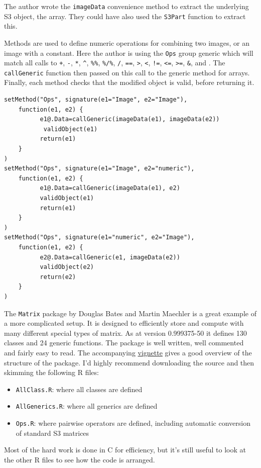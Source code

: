 The author wrote the \texttt{imageData} convenience method to extract
the underlying S3 object, the array. They could have also used the
\texttt{S3Part} function to extract this.

Methods are used to define numeric operations for combining two images,
or an image with a constant. Here the author is using the \texttt{Ops}
group generic which will match all calls to \texttt{+}, \texttt{-},
\texttt{*}, \texttt{\^{}}, \texttt{\%\%}, \texttt{\%/\%}, \texttt{/},
\texttt{==}, \texttt{\textgreater{}}, \texttt{\textless{}}, \texttt{!=},
\texttt{\textless{}=}, \texttt{\textgreater{}=}, \texttt{\&}, and
\texttt{\textbar{}}. The \texttt{callGeneric} function then passed on
this call to the generic method for arrays. Finally, each method checks
that the modified object is valid, before returning it.

\begin{verbatim}
setMethod("Ops", signature(e1="Image", e2="Image"),
    function(e1, e2) {
          e1@.Data=callGeneric(imageData(e1), imageData(e2))
           validObject(e1)
          return(e1)
    }
)
setMethod("Ops", signature(e1="Image", e2="numeric"),
    function(e1, e2) {
          e1@.Data=callGeneric(imageData(e1), e2)
          validObject(e1)
          return(e1)
    }
)
setMethod("Ops", signature(e1="numeric", e2="Image"),
    function(e1, e2) {
          e2@.Data=callGeneric(e1, imageData(e2))
          validObject(e2)
          return(e2)
    }
)
\end{verbatim}

The \texttt{Matrix} package by Douglas Bates and Martin Maechler is a
great example of a more complicated setup. It is designed to efficiently
store and compute with many different special types of matrix. As at
version 0.999375-50 it defines 130 classes and 24 generic functions. The
package is well written, well commented and fairly easy to read. The
accompanying
\href{http://cran.r-project.org/web/packages/Matrix/vignettes/Intro2Matrix.pdf}{vignette}
gives a good overview of the structure of the package. I'd highly
recommend downloading the source and then skimming the following R
files:

\begin{itemize}
\item
  \texttt{AllClass.R}: where all classes are defined
\item
  \texttt{AllGenerics.R}: where all generics are defined
\item
  \texttt{Ops.R}: where pairwise operators are defined, including
  automatic conversion of standard S3 matrices
\end{itemize}

Most of the hard work is done in C for efficiency, but it's still useful
to look at the other R files to see how the code is arranged.
